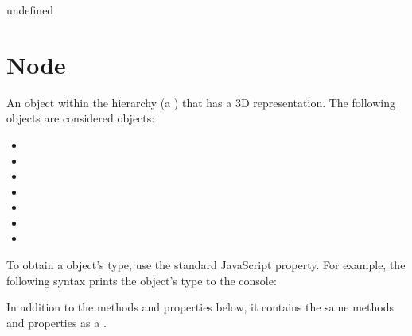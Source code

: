 \documentclass[letterpaper,12pt,english,openany,oneside]{sphinxmanual}
\begin{document}
\label{\detokenize{JS_3D_API:section-75}}\label{\detokenize{JS_3D_API:returns-71}}

undefined


\section{Node}
\label{\detokenize{JS_3D_API:node}}
An object within the  hierarchy (a  ) that has a 3D representation. The following objects are considered  objects:
\begin{itemize}
\item {} 

\item {} 

\item {} 

\item {} 

\item {} 

\item {} 

\item {} 

\end{itemize}

To obtain a  object’s type, use the standard JavaScript  property. For example, the following syntax prints the  object’s type to the console:

\begin{sphinxVerbatim}[commandchars=\\\{\}]
\end{sphinxVerbatim}

In addition to the methods and properties below, it contains the same methods and properties as a .
\end{document}
